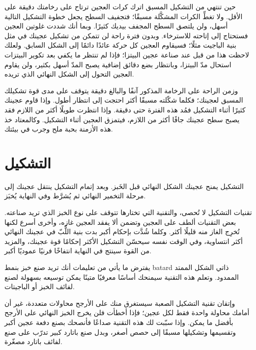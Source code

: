 حين تنتهي من التشكيل المسبق اترك كرات العجين ترتاح على رخامتك  دقيقة على الأقل. ولا تغطِّ الكرات المشكَّلة مسبقًا؛ فتجفيف السطح يجعل خطوة التشكيل التالية أسهل، ولن يلتصق السطح المجفف بيديك كثيرًا. وبما أنك شددت غلوتين العجين فستحتاج إلى إتاحته للاسترخاء. وبدون فترة راحة لن تتمكن من تشكيل عجينك في مثل بنية الباجيت مثلًا؛ فسيقاوم العجين كل حركة عائدًا دائمًا إلى الشكل السابق. ولعلك لاحظت هذا من قبل عند صناعة عجين البيتزا؛ فإذا لم تنتظر ما يكفي بعد تكوير البيتزات استحال مدّ البيتزا، وبانتظار بضع دقائق إضافية يصبح المدّ أسهل بكثير، ولن يقاوم العجين التحول إلى الشكل النهائي الذي تريده.

وزمن الراحة على الرخامة المذكور آنفًا والبالغ  دقيقة يتوقف على مدى قوة تشكيلك المسبق لعجينك؛ فكلما شكّلته مسبقًا أكثر احتجت إلى انتظار أطول. وإذا قاوم عجينك كثيرًا أثناء التشكيل فمُد هذه الفترة حتى  دقيقة. وإذا انتظرت طويلًا أكثر من اللازم فقد يصبح سطح عجينك جافًا أكثر من اللازم، فيتمزق العجين أثناء التشكيل. وكالمعتاد خذ هذه الأزمنة بحبة ملح وجرب في بيئتك.

\section{التشكيل}

\begin{flowchart}[!htb]
\centering

\caption[عملية تشكيل الخبز الحامض]{تمثيل تخطيطي لعملية التشكيل متضمنًا فحوصات عجين مفرط التخمير.}
\label{fig:shaping-decision-tree}
\end{flowchart}

التشكيل يمنح عجينك الشكل النهائي قبل الخَبز. وبعد إتمام التشكيل ينتقل عجينك إلى مرحلة التخمير النهائي ثم يُشرَّط وفي النهاية يُخبَز.

تقنيات التشكيل لا تُحصى، والتقنية التي تختارها تتوقف على نوع الخبز الذي تريد صناعته. بعض التقنيات ألطف على العجين وتضمن ألا يفقد العجين غازه، وأخرى أسرع لكنها تُخرِج الغاز منه قليلًا أكثر. وكلما شُدَّت بإحكام أكبر بدت بنية اللُّبّ في عجينك النهائي أكثر انتساوية، وفي الوقت نفسه سيحسّن التشكيل الأكثر إحكامًا قوة عجينك، والمزيد من القوة سينتج في النهاية انتفاخًا فرنيًا عموديًا أكبر.

يفترض ما يأتي من تعليمات أنك تريد صنع خبز بنمط \textenglish{batard} ذاتي الشكل الممتد الممدود. وتعلم هذه التقنية سيمنحك أساسًا معرفيًا متينًا يمكن توسيعه بسهولة لصنع لفائف الخبز أو الباجيتات.

وإتقان تقنية التشكيل الصعبة سيستغرق منك على الأرجح محاولات متعددة، غير أن أمامك محاولة واحدة فقط لكل عجين؛ فإذا أخطأت فلن يخرج الخبز النهائي على الأرجح بأفضل ما يمكن. وإذا سبّبت لك هذه التقنية صداعًا فأنصحك بصنع دفعة عجين أكبر وتقسيمها وتشكيلها مسبقًا إلى حصص أصغر، وبدل صنع باتارد كبير تدرّب على صنع لفائف باتارد مصغّرة.

